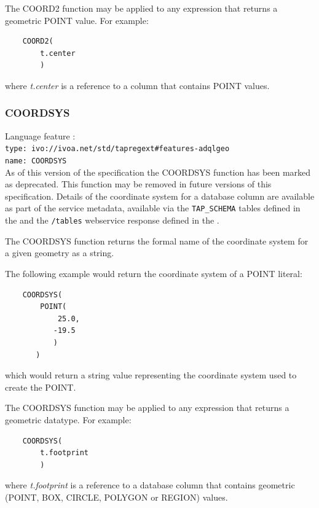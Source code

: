\documentclass[11pt,a4paper]{ivoa}
\begin{document}
The COORD2 function may be applied to any expression that returns a
geometric POINT value.
For example:
\begin{verbatim}
    COORD2(
        t.center
        )
\end{verbatim}
\noindent
where \textit{t.center} is a reference to a column that contains POINT values.

\subsubsection{COORDSYS}
\label{sec:functions.geom.coordsys}
{\footnotesize Language feature :}\\
{\footnotesize \verb|type: ivo://ivoa.net/std/tapregext#features-adqlgeo|}\\
{\footnotesize \verb|name: COORDSYS|}\\

As of this version of the specification the COORDSYS function has
been marked as deprecated. This function may be removed in future versions
of this specification.
Details of the coordinate system for a database column are available as part of
the service metadata, available via the \verb:TAP_SCHEMA: tables defined in the
\TAPSpec{} and the \verb:/tables: webservice response defined in the \VOSISpec{}.


The COORDSYS function returns the formal name of the coordinate system for
a given geometry as a string.

The following example would return the coordinate system of a POINT literal:
\begin{verbatim}
    COORDSYS(
        POINT(
            25.0,
           -19.5
           )
       )
\end{verbatim}
\noindent
which would return a string value representing the coordinate system used
to create the POINT.

The COORDSYS function may be applied to any expression that returns a
geometric datatype. For example:
\begin{verbatim}
    COORDSYS(
        t.footprint
        )
\end{verbatim}
\noindent
where \textit{t.footprint} is a reference to a database column that
contains geometric (POINT, BOX, CIRCLE, POLYGON or REGION) values.
\end{document}
